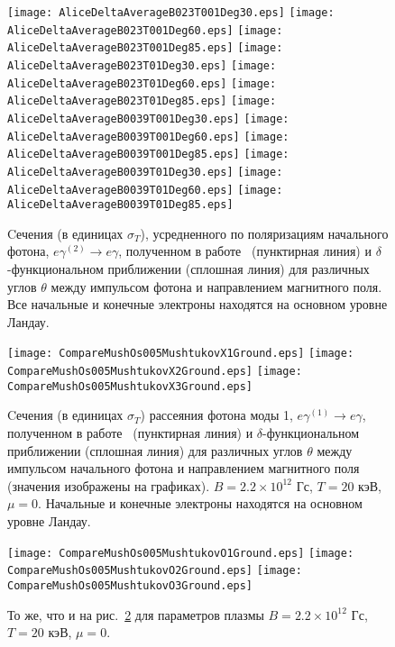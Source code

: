 \begin{figure}[t!]\centering
	\texttt{[image: AliceDeltaAverageB023T001Deg30.eps]}
	\texttt{[image: AliceDeltaAverageB023T001Deg60.eps]}
	\texttt{[image: AliceDeltaAverageB023T001Deg85.eps]}
	\texttt{[image: AliceDeltaAverageB023T01Deg30.eps]}
	\texttt{[image: AliceDeltaAverageB023T01Deg60.eps]}
	\texttt{[image: AliceDeltaAverageB023T01Deg85.eps]}
	\texttt{[image: AliceDeltaAverageB0039T001Deg30.eps]}
	\texttt{[image: AliceDeltaAverageB0039T001Deg60.eps]}
	\texttt{[image: AliceDeltaAverageB0039T001Deg85.eps]}
	\texttt{[image: AliceDeltaAverageB0039T01Deg30.eps]}
	\texttt{[image: AliceDeltaAverageB0039T01Deg60.eps]}
	\texttt{[image: AliceDeltaAverageB0039T01Deg85.eps]}	
	\caption{Cечения (в единицах $\sigma_T$), усредненного по поляризациям начального фотона, $e\gamma^{(2)}  \to e\gamma$, полученном в работе~\cite{Harding:1991} (пунктирная линия) и $\delta$-функциональном приближении (сплошная линия) для различных углов $\theta$ между импульсом фотона и направлением магнитного поля. Все начальные и конечные электроны находятся на основном уровне Ландау.}
	\label{fig:CompAndHardO}
\end{figure}
\begin{figure}[t!]\centering
	\texttt{[image: CompareMushOs005MushtukovX1Ground.eps]}
	\texttt{[image: CompareMushOs005MushtukovX2Ground.eps]}
	\texttt{[image: CompareMushOs005MushtukovX3Ground.eps]}
	\caption{Cечения (в единицах $\sigma_T$) рассеяния фотона моды 1, 
	$e\gamma^{(1)}  \to e\gamma$, полученном в работе~\cite{Mushtukov:2016} 
	(пунктирная линия) и $\delta$-функциональном приближении (сплошная линия) 
	для различных углов $\theta$ между импульсом начального фотона и 
	направлением магнитного поля (значения изображены на графиках). 
	$B=2.2\times 10^{12}$ Гс, $T = 20$ кэВ, $\mu=0$. Начальные и конечные 
	электроны находятся на основном уровне Ландау.}
	\label{fig:CompAndMushXGround}
\end{figure}
\begin{figure}[t!]\centering
	\texttt{[image: CompareMushOs005MushtukovO1Ground.eps]}
	\texttt{[image: CompareMushOs005MushtukovO2Ground.eps]}
	\texttt{[image: CompareMushOs005MushtukovO3Ground.eps]}
	\caption{То же, что и на рис.~\ref{fig:CompAndMushXGround} для параметров 
	плазмы $B=2.2\times 10^{12}$ Гс, $T = 20$ кэВ, $\mu=0$.}
	\label{fig:CompAndMushO}
\end{figure}
